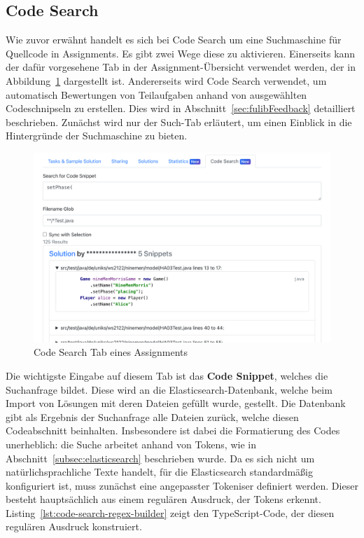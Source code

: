 \subsection{Code Search}\label{subsec:code-search}

Wie zuvor erwähnt handelt es sich bei Code Search um eine Suchmaschine für Quellcode in Assignments.
Es gibt zwei Wege diese zu aktivieren.
Einerseits kann der dafür vorgesehene Tab in der Assignment-Übersicht verwendet werden, der in Abbildung~\ref{fig:assignment-code-search} dargestellt ist.
Andererseits wird Code Search verwendet, um automatisch Bewertungen von Teilaufgaben anhand von ausgewählten Codeschnipseln zu erstellen.
Dies wird in Abschnitt~\ref{sec:fulibFeedback} detailliert beschrieben.
Zunächst wird nur der Such-Tab erläutert, um einen Einblick in die Hintergründe der Suchmaschine zu bieten.

\begin{figure}
    \centering
    \includegraphics[width=\textwidth]{images/assignment-code-search.png}
    \caption{Code Search Tab eines Assignments}
    \label{fig:assignment-code-search}
\end{figure}

Die wichtigste Eingabe auf diesem Tab ist das \textbf{Code Snippet}, welches die Suchanfrage bildet.
Diese wird an die Elasticsearch-Datenbank, welche beim Import von Lösungen mit deren Dateien gefüllt wurde, gestellt.
Die Datenbank gibt als Ergebnis der Suchanfrage alle Dateien zurück, welche diesen Codeabschnitt beinhalten.
Insbesondere ist dabei die Formatierung des Codes unerheblich:
die Suche arbeitet anhand von Tokens, wie in Abschnitt~\ref{subsec:elasticsearch} beschrieben wurde.
Da es sich nicht um natürlichsprachliche Texte handelt, für die Elasticsearch standardmäßig konfiguriert ist, muss zunächst eine angepasster Tokeniser definiert werden.
Dieser besteht hauptsächlich aus einem regulären Ausdruck, der Tokens erkennt.
Listing~\ref{lst:code-search-regex-builder} zeigt den TypeScript-Code, der diesen regulären Ausdruck konstruiert.

